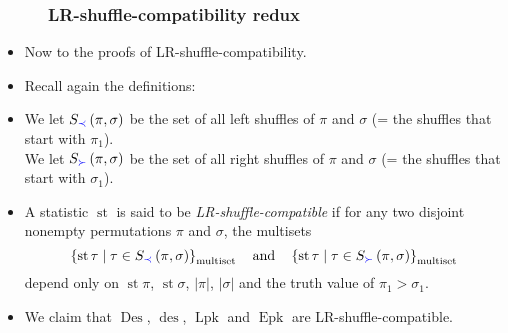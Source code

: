 \documentclass{beamer}
\newcommand{\blue}{\color{blue}}
\newcommand{\Lpk}{\operatorname{Lpk}}
\newcommand{\Epk}{\operatorname{Epk}}
\newcommand{\Des}{\operatorname{Des}}
\newcommand{\des}{\operatorname{des}}
\newcommand{\st}{\operatorname{st}}
\newcommand{\fti}[1]{\frametitle{\ \ \ \ \ #1}}
\newcommand{\set}[1]{\left\{ #1 \right\}}
\newcommand{\abs}[1]{\left| #1 \right|}
\newcommand{\tup}[1]{\left( #1 \right)}
\newcommand{\defn}[1]{{\color{darkred}\emph{#1}}} %
\theoremstyle{plain}
\begin{document}
\begin{frame}
\fti{LR-shuffle-compatibility redux}

\begin{itemize}

\item Now to the proofs of LR-shuffle-compatibility. \pause

\item Recall again the definitions:

\item We let $S_{\blue \prec} \tup{\pi, \sigma}$ be the set of all {\blue left} shuffles of $\pi$
      and $\sigma$ (= the shuffles that {\blue start with $\pi_1$}). \\
      We let $S_{\blue \succ} \tup{\pi, \sigma}$ be the set of all {\blue right} shuffles of $\pi$
      and $\sigma$ (= the shuffles that {\blue start with $\sigma_1$}).

\pause

\item A statistic $\st$ is said to be \defn{LR-shuffle-compatible}
      if for any two disjoint nonempty permutations $\pi$ and $\sigma$,
      the multisets
      \[
      \set{ \st\tau \mid \tau\in S_{\blue \prec} \tup{\pi, \sigma} }_{\text{multiset}}
      \quad \text{and} \quad
      \set{ \st\tau \mid \tau\in S_{\blue \succ} \tup{\pi, \sigma} }_{\text{multiset}}
      \]
      depend only on $\st \pi$, $\st \sigma$, $\abs{\pi}$,
      $\abs{\sigma}$ {\blue and the truth value of $\pi_1 > \sigma_1$}.

\pause
\item We claim that $\Des$, $\des$, $\Lpk$ and $\Epk$ are LR-shuffle-compatible.

\end{itemize}

\end{frame}
\end{document}
